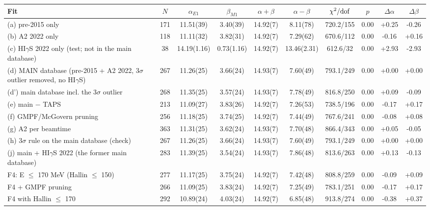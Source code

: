 \begin{tabular}{lccccccccc}
\hline
Fit & $N$ & $\alpha_{E1}$ & $\beta_{M1}$ & $\alpha+\beta$ & $\alpha-\beta$ & $\chi^2/{\rm dof}$ & $p$ & $\Delta\alpha$ & $\Delta\beta$ \\
\hline
(a) pre-2015 only & 171 & 11.51(39) & 3.40(39) & 14.92(7) & 8.11(78) & 720.2/155 & 0.00 & +0.25 & -0.26 \\
(b) A2 2022 only & 118 & 11.11(32) & 3.82(31) & 14.92(7) & 7.29(62) & 670.6/112 & 0.00 & -0.16 & +0.16 \\
(c) HI$\gamma$S 2022 only (test; not in the main database) & 38 & 14.19(1.16) & 0.73(1.16) & 14.92(7) & 13.46(2.31) & 612.6/32 & 0.00 & +2.93 & -2.93 \\
(d) MAIN database (pre-2015 + A2 2022, 3$\sigma$ outlier removed, no HI$\gamma$S) & 267 & 11.26(25) & 3.66(24) & 14.93(7) & 7.60(49) & 793.1/249 & 0.00 & +0.00 & +0.00 \\
(d') main database incl. the 3$\sigma$ outlier & 268 & 11.35(25) & 3.57(24) & 14.93(7) & 7.78(49) & 816.8/250 & 0.00 & +0.09 & -0.09 \\
(e) main $-$ TAPS & 213 & 11.09(27) & 3.83(26) & 14.92(7) & 7.26(53) & 738.5/196 & 0.00 & -0.17 & +0.17 \\
(f) GMPF/McGovern pruning & 256 & 11.18(25) & 3.74(25) & 14.92(7) & 7.44(49) & 767.6/241 & 0.00 & -0.08 & +0.08 \\
(g) A2 per beamtime & 363 & 11.31(25) & 3.62(24) & 14.93(7) & 7.70(48) & 866.4/343 & 0.00 & +0.05 & -0.05 \\
(h) 3$\sigma$ rule on the main database (check) & 267 & 11.26(25) & 3.66(24) & 14.93(7) & 7.60(49) & 793.1/249 & 0.00 & +0.00 & +0.00 \\
(j) main + HI$\gamma$S 2022 (the former main database) & 283 & 11.39(25) & 3.54(24) & 14.93(7) & 7.86(48) & 813.6/263 & 0.00 & +0.13 & -0.13 \\
F4: E $\le$ 170 MeV (Hallin $\le$ 150) & 277 & 11.17(25) & 3.75(24) & 14.92(7) & 7.42(48) & 808.8/259 & 0.00 & -0.09 & +0.09 \\
F4 + GMPF pruning & 266 & 11.09(25) & 3.83(24) & 14.92(7) & 7.25(49) & 783.1/251 & 0.00 & -0.17 & +0.17 \\
F4 with Hallin $\le$ 170 & 292 & 10.89(24) & 4.03(24) & 14.92(7) & 6.85(48) & 913.8/274 & 0.00 & -0.38 & +0.37 \\
\hline
\end{tabular}

